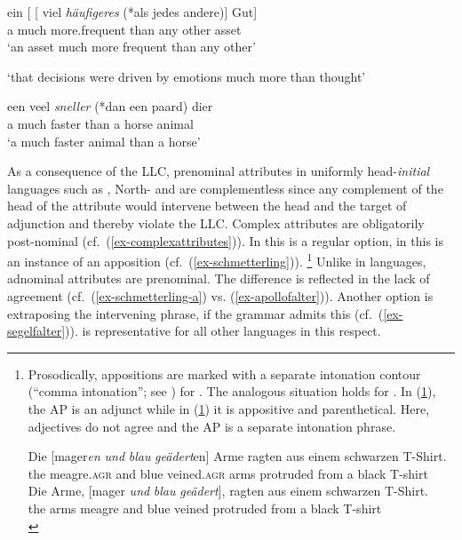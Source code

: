 \documentclass[output=paper
  ,nobabel
  ,uniformtopskip %
]{langscibook}
\begin{document}
\ex
\gll ein [ [ viel \emph{häufigeres} (*als jedes andere)] Gut] \\
     a   {}        {}        much more.frequent \hphantom{(*}than any other asset \\
\glt `an asset much more frequent than any other'

\ex\label{ex-beslissingen}
\glt `that decisions were driven by emotions much more than thought'

\ex\label{ex-dier}
\gll  een veel \emph{sneller} (*dan een paard) dier  \\
a much faster \hphantom{(*}than a horse animal\\
\glt `a much faster animal than a horse'

\zl

\noindent
As a consequence of the LLC, prenominal attributes in uniformly head-\emph{initial} languages such as , North- and  are complementless since any complement of the head of the attribute would intervene between the head and the target of adjunction and thereby violate the LLC. Complex attributes are obligatorily post-nominal (cf.\ (\ref{ex-complexattributes})). In  this is a regular option, in  this is an instance of an apposition (cf.\ (\ref{ex-schmetterling})).%
%
\footnote{Prosodically, appositions are marked with a separate intonation contour (``comma intonation''; see \citealp[Section~2.3.3]{Dehe2014}) for . The analogous situation holds for . In (\ref{ex-mager}), the AP is an adjunct while in (\ref{ex-arme}) it is appositive and parenthetical. Here, adjectives do not agree and the AP is a separate intonation phrase.
	
\ea\label{ex-mager} 
\gll Die [mager\emph{en} \emph{und} \emph{blau} \emph{geädert}en] Arme ragten aus einem schwarzen T-Shirt. \\ 
     the \spacebr{}meagre\textsc{.agr} and blue veined\textsc{.agr} arms protruded from a black T-shirt \\
\ex\label{ex-arme} 
\gll Die Arme, [mager \emph{und} \emph{blau} \emph{geädert}], ragten aus einem schwarzen T-Shirt. \\ 
     the arms \spacebr{}meagre and blue veined protruded from a black T-shirt \\
\z
}
Unlike in  languages, adnominal attributes are prenominal. The difference is reflected in the lack of agreement (cf.\ (\ref{ex-schmetterling-a}) vs. (\ref{ex-apollofalter})). Another option is extraposing the intervening phrase, if the grammar admits this (cf.\ (\ref{ex-segelfalter})).  is representative for all other  languages in this respect.
\end{document}

